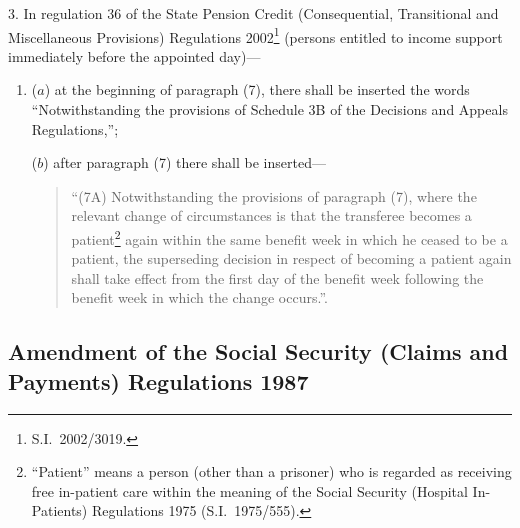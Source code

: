 \documentclass[12pt,a4paper]{article}
\begin{document}
3.  In regulation 36 of the State Pension Credit (Consequential, Transitional and Miscellaneous Provisions) Regulations 2002\footnote{S.I.\ 2002/3019.} (persons entitled to income support immediately before the appointed day)—
\begin{enumerate}\item[]
($a$) at the beginning of paragraph (7), there shall be inserted the words “Notwithstanding the provisions of Schedule 3B of the Decisions and Appeals Regulations,”;

($b$) after paragraph (7) there shall be inserted—
\begin{quotation}
“(7A) Notwithstanding the provisions of paragraph (7), where the relevant change of circumstances is that the transferee becomes a patient\footnote{“Patient” means a person (other than a prisoner) who is regarded as receiving free in-patient care within the meaning of the Social Security (Hospital In-Patients) Regulations 1975 (S.I.\ 1975/555).} again within the same benefit week in which he ceased to be a patient, the superseding decision in respect of becoming a patient again shall take effect from the first day of the benefit week following the benefit week in which the change occurs.”.
\end{quotation}
\end{enumerate}

\subsection[4. Amendment of the Social Security (Claims and Payments) Regulations 1987]{Amendment of the Social Security (Claims and Payments) Regulations 1987}
\end{document}
